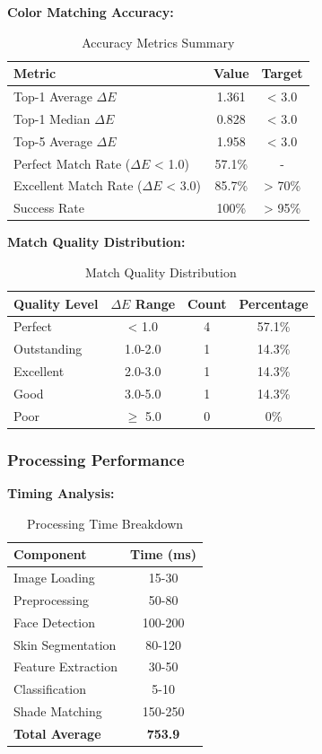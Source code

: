 \textbf{Color Matching Accuracy:}

\begin{table}[h]
\centering
\begin{tabular}{|l|c|c|}
\hline
\textbf{Metric} & \textbf{Value} & \textbf{Target} \\
\hline
Top-1 Average $\Delta E$ & 1.361 & < 3.0 \\
Top-1 Median $\Delta E$ & 0.828 & < 3.0 \\
Top-5 Average $\Delta E$ & 1.958 & < 3.0 \\
Perfect Match Rate ($\Delta E$ < 1.0) & 57.1\% & - \\
Excellent Match Rate ($\Delta E$ < 3.0) & 85.7\% & > 70\% \\
Success Rate & 100\% & > 95\% \\
\hline
\end{tabular}
\caption{Accuracy Metrics Summary}
\end{table}

\textbf{Match Quality Distribution:}

\begin{table}[h]
\centering
\begin{tabular}{|l|c|c|c|}
\hline
\textbf{Quality Level} & \textbf{$\Delta E$ Range} & \textbf{Count} & \textbf{Percentage} \\
\hline
Perfect & < 1.0 & 4 & 57.1\% \\
Outstanding & 1.0-2.0 & 1 & 14.3\% \\
Excellent & 2.0-3.0 & 1 & 14.3\% \\
Good & 3.0-5.0 & 1 & 14.3\% \\
Poor & $\geq$ 5.0 & 0 & 0\% \\
\hline
\end{tabular}
\caption{Match Quality Distribution}
\end{table}

\subsubsection{Processing Performance}

\textbf{Timing Analysis:}

\begin{table}[h]
\centering
\begin{tabular}{|l|c|}
\hline
\textbf{Component} & \textbf{Time (ms)} \\
\hline
Image Loading & 15-30 \\
Preprocessing & 50-80 \\
Face Detection & 100-200 \\
Skin Segmentation & 80-120 \\
Feature Extraction & 30-50 \\
Classification & 5-10 \\
Shade Matching & 150-250 \\
\hline
\textbf{Total Average} & \textbf{753.9} \\
\hline
\end{tabular}
\caption{Processing Time Breakdown}
\end{table}

